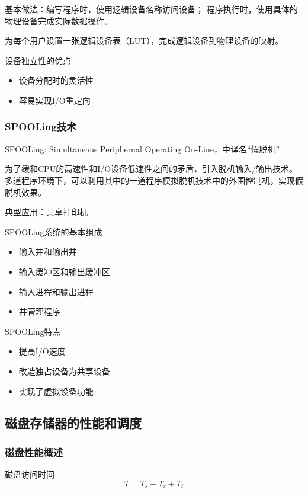 \documentclass[12pt, a4paper, oneside]{ctexart}
\begin{document}
基本做法：编写程序时，使用逻辑设备名称访问设备；
程序执行时，使用具体的物理设备完成实际数据操作。

为每个用户设置一张逻辑设备表（LUT），完成逻辑设备到物理设备的映射。

设备独立性的优点
\begin{itemize}
    \item 设备分配时的灵活性
    \item 容易实现I/O重定向
\end{itemize}

\subsubsection{SPOOLing技术}

SPOOLing: Simultaneaus Periphernal Operating On-Line，中译名“假脱机”

为了缓和CPU的高速性和I/O设备低速性之间的矛盾，引入脱机输入/输出技术。
多道程序环境下，可以利用其中的一道程序模拟脱机技术中的外围控制机，实现假脱机效果。

典型应用：共享打印机

SPOOLing系统的基本组成
\begin{itemize}
    \item 输入井和输出井
    \item 输入缓冲区和输出缓冲区
    \item 输入进程和输出进程
    \item 井管理程序
\end{itemize}

SPOOLing特点
\begin{itemize}
    \item 提高I/O速度
    \item 改造独占设备为共享设备
    \item 实现了虚拟设备功能
\end{itemize}

\subsection{磁盘存储器的性能和调度}

\subsubsection{磁盘性能概述}

磁盘访问时间
\begin{equation}
    T=T_s+T_r+T_t
\end{equation}
\end{document}
